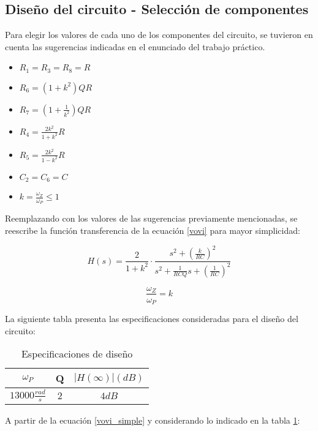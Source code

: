 \subsection{Dise\~no del circuito - Selecci\'on de componentes}
Para elegir los valores de cada uno de los componentes del circuito, se tuvieron en cuenta las sugerencias indicadas en el enunciado del trabajo pr\'actico.

\begin{itemize}
	\item $R_1 = R_3 = R_8 = R$
	\item $R_6 = (1 + k^2) Q R$
	\item $R_7 = (1 + \frac{1}{k^2})Q R$
	\item $R_4 = \frac{2k^2}{1+k^2}R$
	\item $R_5 = \frac{2k^2}{1-k^2}R$
	\item $C_2 = C_6 = C$
	\item $k = \frac{\omega_Z}{\omega_P} \leqslant 1 $
\end{itemize}

Reemplazando con los valores de las sugerencias previamente mencionadas, se reescribe la funci\'on transferencia de la ecuaci\'on \ref{vovi} para mayor simplicidad:

\begin{equation}
	H(s) = \frac{2}{1+k^2} \cdot \frac{s^2 + \left( \frac{k}{RC}\right)^2}{s^2 + \frac{1}{RCQ} s + \left(\frac{1}{RC}\right)^2}
	\label{vovi_simple}
\end{equation}

\begin{equation}
	\frac{\omega_Z}{\omega_P} = k
\end{equation}

La siguiente tabla presenta las especificaciones consideradas para el dise\~no del circuito:

\begin{table}[h!]
	\centering
	\begin{tabular}{c c c}%
		\bfseries $\omega_P$ & Q & $|H(\infty)| (dB)$ \\ \hline
		$13000 \frac{rad}{s}$ & $2$ & $4dB$\\
		\hline
	\end{tabular}
	\caption{Especificaciones de dise\~no}
	\label{especificaciones}
\end{table}

A partir de la ecuaci\'on \ref{vovi_simple} y considerando lo indicado en la tabla \ref{especificaciones}:

